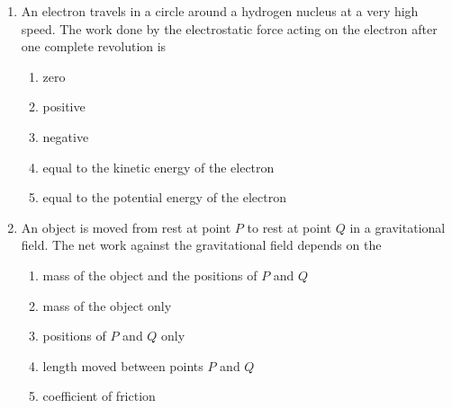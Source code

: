 \documentclass{../../../oss-apphys}
\begin{document}
\begin{multicols}{2}
\begin{enumerate}[leftmargin=18pt,resume]
  \item An electron travels in a circle around a hydrogen nucleus at a very high
    speed. The work done by the electrostatic force acting on the electron
    after one complete revolution is
    \begin{enumerate}[nosep,label=(\Alph*)]
    \item zero
    \item positive
    \item negative
    \item equal to the kinetic energy of the electron
    \item equal to the potential energy of the electron
    \end{enumerate}
    \columnbreak
    
  \item An object is moved from rest at point $P$ to rest at point $Q$ in a
    gravitational field. The net work against the gravitational field depends
    on the
    \begin{enumerate}[nosep,label=(\Alph*)]
    \item mass of the object and the positions of $P$ and $Q$
    \item mass of the object only
    \item positions of $P$ and $Q$ only
    \item length moved between points $P$ and $Q$
    \item coefficient of friction
    \end{enumerate}
    \vspace{.8in}
%  

\end{enumerate}
\end{multicols}
\end{document}
